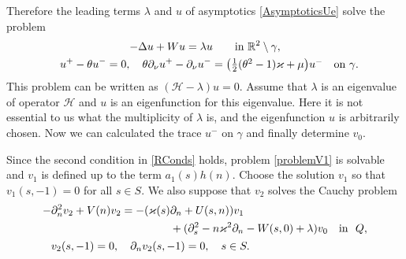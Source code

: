 \documentclass[reqno]{amsart}
\theoremstyle{plain}
\numberwithin{equation}{section}
\renewcommand{\kappa}{\varkappa}
\newcommand{\Real}{\mathbb R}
\newcommand{\cH}{\mathcal{H}}
\newcommand{\pte}{\partial_n}
\begin{document}
Therefore the leading terms $\lambda$ and $u$ of asymptotics \eqref{AsymptoticsUe} solve the problem
\begin{gather}\label{LimitProblemEq}
-\Delta u+Wu=\lambda u \qquad \hbox{in  } \Real^2\setminus \gamma,
\\ \label{RConds}
 \phantom{-}u^+-\theta u^-=0,  \quad
\theta\partial_\nu u^+-\partial_\nu u^-
=\big(\textstyle\frac{1}{2}(\theta^2-1)\kappa+\mu \big) u^- \quad \hbox{on } \gamma.
\end{gather}
This problem can be written as $(\cH-\lambda)u=0$.
Assume that $\lambda$ is an eigenvalue of operator $\cH$ and $u$  is an eigenfunction for this eigenvalue.
Here it is not essential to us what the multiplicity of $\lambda$ is, and the eigenfunction $u$ is arbitrarily chosen.
Now we can calculated the trace $u^-$ on $\gamma$ and  finally determine $v_0$.

Since the second condition in \eqref{RConds} holds,
problem \eqref{problemV1} is solvable and $v_1$ is defined up to the term $a_1(s) h(n)$.
Choose the solution $v_1$ so that $v_1(s,-1)=0$ for all $s\in S$.
We also suppose that $v_2$ solves the Cauchy problem
\begin{align}
&\begin{aligned}\label{problemV2eqn}
  -\pte^2 v_2+V(n)v_2=-(\kappa(s)&\pte +U(s,n)) v_1\\
  &+(\partial^2_s-n\kappa^2\partial_n-W(s,0)+\lambda)v_0
  \quad \hbox{in \ } Q,
\end{aligned}
\\\label{problemV2conditions}
 & \phantom{-} v_2(s, -1)=0,
 \quad
 \partial_n v_2(s, -1)=0, \quad s\in S.
\end{align}
\end{document}
